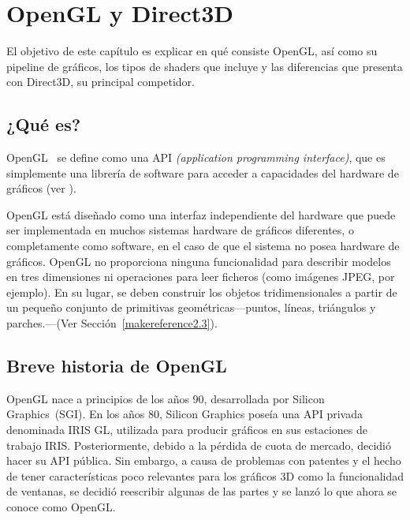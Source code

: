 
\cleardoublepage


\chapter{OpenGL y Direct3D}
\label{makereference2}

El objetivo de este capítulo es explicar en qué consiste OpenGL, así como su
pipeline de gráficos, los tipos de shaders que incluye y las diferencias que
presenta con Direct3D, su principal competidor.

\section{¿Qué es?}
\label{makereference2.1}

OpenGL~\cite{OpenGL} se define como una API \textit{(application programming interface)}, que
es simplemente una librería de software para acceder a capacidades del hardware
de gráficos (ver \citet{Shreiner:2009:OPG:1696492}).

OpenGL está diseñado como una interfaz independiente del hardware que puede ser
implementada en muchos sistemas hardware de gráficos diferentes, o completamente
como software, en el caso de que el sistema no posea hardware de gráficos.
OpenGL no proporciona ninguna funcionalidad para describir modelos en tres
dimensiones ni operaciones para leer ficheros (como imágenes JPEG, por ejemplo).
En su lugar, se deben construir los objetos tridimensionales a partir de un
pequeño conjunto de primitivas geométricas---puntos, líneas, triángulos y
parches.---(Ver Sección~\ref{makereference2.3}).

\section{Breve historia de OpenGL}
\label{makereference2.2}

OpenGL nace a principios de los años 90, desarrollada por Silicon Graphics~(SGI).  En
los años 80, Silicon Graphics poseía una API privada denominada IRIS GL,
utilizada para producir gráficos en sus estaciones de trabajo IRIS.
Posteriormente, debido a la pérdida de cuota de mercado, decidió hacer su API
pública. Sin embargo, a causa de problemas con patentes y el hecho de tener
características poco relevantes para los gráficos 3D como la funcionalidad de
ventanas, se decidió reescribir algunas de las partes y se lanzó lo que ahora se
conoce como OpenGL.

